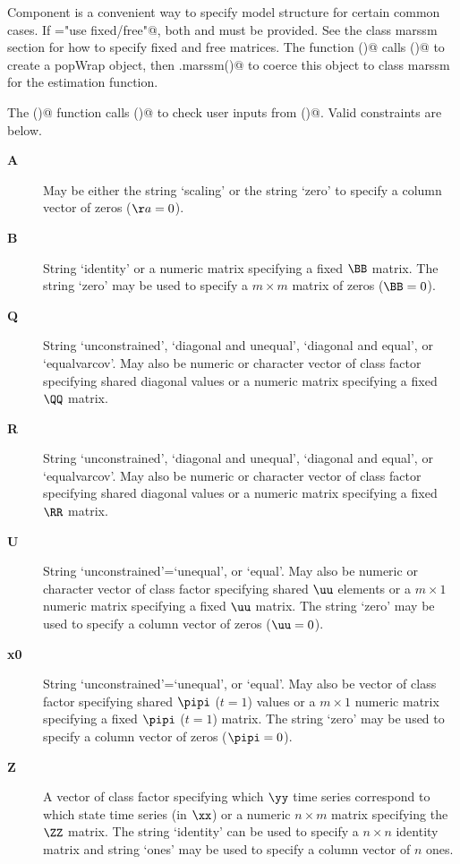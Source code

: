 Component \verb@constraint@ is a convenient way to specify model structure for certain common cases.  If \verb@constraint="use fixed/free"@, both \verb@fixed@ and \verb@free@ must be provided.  See the class marssm section for how to specify fixed and free matrices.  The function \verb@MARSS()@ calls \verb@popWrap()@ to create a popWrap object, then \verb@is.marssm()@ to coerce this object to class marssm for the estimation function.

  The \verb@popWrap()@ function calls \verb@checkPopWrap()@ to check user inputs from \verb@MARSS()@. Valid constraints are below.  

  \begin{description}   
    \item[\textbf{A}]{ May be either the string `scaling' or the string `zero' to specify a column vector of zeros ($\aa=0$).}
    \item[\textbf{B}]{ String `identity' or a numeric matrix specifying a fixed $\BB$ matrix.  The string `zero' may be used to specify a $m \times m$ matrix of zeros ($\BB=0$).}
    \item[\textbf{Q}]{ String `unconstrained', `diagonal and unequal', `diagonal and equal', or `equalvarcov'. May also be numeric or character vector  of class factor specifying shared diagonal values or a numeric matrix specifying a fixed $\QQ$ matrix. } 
    \item[\textbf{R}]{ String `unconstrained', `diagonal and unequal', `diagonal and equal', or `equalvarcov'. May also be numeric or character vector  of class factor specifying shared diagonal values or a numeric matrix specifying a fixed $\RR$ matrix. }
    \item[\textbf{U}]{ String `unconstrained'=`unequal', or `equal'. May also be numeric or character vector  of class factor specifying shared $\uu$ elements or a $m \times 1$ numeric matrix specifying a fixed $\uu$ matrix. The string `zero' may be used to specify a column vector of zeros ($\uu=0$).}
    \item[\textbf{x0}]{ String `unconstrained'=`unequal', or `equal'. May also be vector  of class factor specifying shared $\pipi$ ($t=1$) values or a $m \times 1$ numeric matrix specifying a fixed $\pipi$ ($t=1$) matrix. The string `zero' may be used to specify a column vector of zeros ($\pipi=0$).}
    \item[\textbf{Z}]{ A vector  of class factor specifying which $\yy$ time series correspond to which state time series (in $\xx$) or a numeric $n \times m$ matrix specifying the $\ZZ$ matrix. The string `identity' can be used to specify a $n \times n$ identity matrix and string `ones' may be used to specify a column vector of $n$ ones.}
  \end{description}
  


